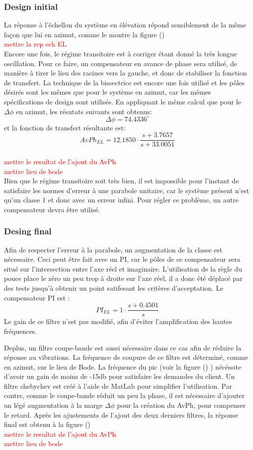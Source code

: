 \documentclass{udes_rapport} %
\begin{document}
\subsubsection{Design initial}
La réponse à l'échellon du système en élévation répond sensiblement de la même façon que lui en azimut, comme le montre la figure ()
\\
\textcolor{red}{mettre la rep ech EL}
\\
Encore une fois, le régime transitoire est à corriger étant donné la très longue oscillation. Pour ce faire, un compensateur en avance de phase sera utilisé, de manière à tirer le lieu des racines vers la gauche, et donc de stabiliser la fonction de transfert. La technique de la bissectrice est encore une fois utilisé et les pôles désirés sont les mêmes que pour le système en azimut, car les mêmes spécifications de design sont utilisés. En appliquant le même calcul que pour le $\Delta \phi$ en azimut, les résutats suivants sont obtenus:
\[\Delta \phi = 74.4336^\circ\]
et la fonction de transfert résultante est:
\[AvPh_{EL} = 12.1850 \cdot \frac{s+3.7657}{s+33.0051}\]
\\
\textcolor{red}{mettre le resultat  de l'ajout du AvPh}
\\
\textcolor{red}{mettre lieu de bode}
\\
Bien que le régime transitoire soit très bien, il est impossible pour l'instant de satisfaire les normes d'erreur à une parabole unitaire, car le système présent n'est qu'un classe 1 et donc avec un erreur infini. Pour régler ce problème, un autre compensateur devra être utilisé.

\subsubsection{Desing final}
Afin de respecter l'erreur à la parabole, un augmentation de la classe est nécessaire. Ceci peut être fait avec un PI, car le pôles de ce compensateur sera situé sur l'intersection entre l'axe réel et imaginaire. L'utilisation de la règle du pouce place le zéro un peu trop à droite sur l'axe réel, il a donc été déplacé par des tests jusqu'à obtenir un point satifesant les critères d'acceptation. Le compensateur PI est :
\[PI_{EL} = 1 \cdot \frac{s+0.4501}{s}\]
Le gain de ce filtre n'est pas modifié, afin d'éviter l'amplification des hautes fréquences.

Deplus, un filtre coupe-bande est aussi nécessaire dans ce cas afin de réduire la réponse au vibrations. La fréquence de coupure de ce filtre est déterminé, comme en azimut, sur le lieu de Bode. La fréquence du pic (voir la figure () ) nécéssite d'avoir un gain de moins de -15db pour satisfaire les demandes du client. Un filtre chebychev est créé à l'aide de MatLab pour simplifier l'utilisation. Par contre, comme le coupe-bande réduit un peu la phase, il est nécessaire d'ajouter un légé augmentation à la marge $\Delta \phi$ pour la création du AvPh, pour compenser le retard.
Après les ajustements de l'ajout des deux derniers filtres, la réponse final est obtenu à la figure () 
\\
\textcolor{red}{mettre le resultat  de l'ajout du AvPh}
\\
\textcolor{red}{mettre lieu de bode}
\\
\end{document}
